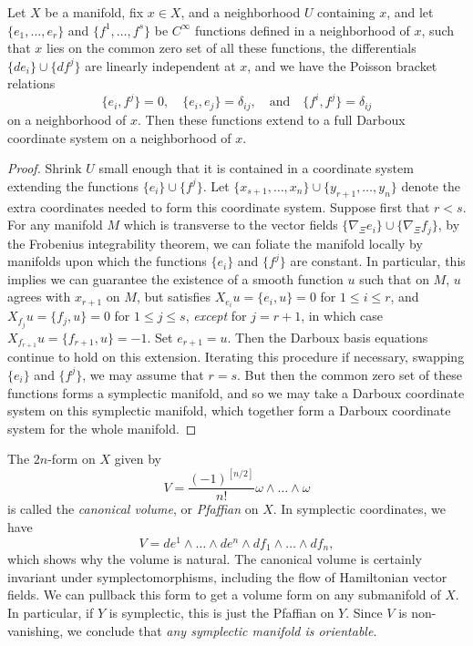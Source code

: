 \begin{theorem}
    Let $X$ be a manifold, fix $x \in X$, and a neighborhood $U$ containing $x$, and let $\{ e_1,\dots,e_r \}$ and $\{ f^1,\dots,f^s \}$ be $C^\infty$ functions defined in a neighborhood of $x$, such that $x$ lies on the common zero set of all these functions, the differentials $\{ de_i \} \cup \{ df^j \}$ are linearly independent at $x$, and we have the Poisson bracket relations
    \[ \{ e_i, f^j \} = 0, \quad \{ e_i, e_j \} = \delta_{ij}, \quad\text{and}\quad \{ f^i, f^j \} = \delta_{ij} \]
    on a neighborhood of $x$. Then these functions extend to a full Darboux coordinate system on a neighborhood of $x$.
\end{theorem}
\begin{proof}
    Shrink $U$ small enough that it is contained in a coordinate system extending the functions $\{ e_i \} \cup \{ f^j \}$. Let $\{ x_{s+1}, \dots, x_n \} \cup \{ y_{r+1}, \dots, y_n \}$ denote the extra coordinates needed to form this coordinate system. Suppose first that $r < s$. For any manifold $M$ which is transverse to the vector fields $\{ \nabla_\Xi e_i \} \cup \{ \nabla_\Xi f_j \}$, by the Frobenius integrability theorem, we can foliate the manifold locally by manifolds upon which the functions $\{ e_i \}$ and $\{ f^j \}$ are constant. In particular, this implies we can guarantee the existence of a smooth function $u$ such that on $M$, $u$ agrees with $x_{r+1}$ on $M$, but satisfies $X_{e_i} u = \{ e_i, u \} = 0$ for $1 \leq i \leq r$, and $X_{f_j} u = \{ f_j, u \} = 0$ for $1 \leq j \leq s$, \emph{except} for $j = r+1$, in which case $X_{f_{r+1}} u = \{ f_{r+1}, u \} = -1$. Set $e_{r+1} = u$. Then the Darboux basis equations continue to hold on this extension. Iterating this procedure if necessary, swapping $\{ e_i \}$ and $\{ f^j \}$, we may assume that $r = s$. But then the common zero set of these functions forms a symplectic manifold, and so we may take a Darboux coordinate system on this symplectic manifold, which together form a Darboux coordinate system for the whole manifold.
\end{proof}

The $2n$-form on $X$ given by
%
\[ V = \frac{(-1)^{[n/2]}}{n!} \omega \wedge \dots \wedge \omega \]
%
is called the \emph{canonical volume}, or \emph{Pfaffian} on $X$. In symplectic coordinates, we have
%
\[ V = de^1 \wedge \dots \wedge de^n \wedge df_1 \wedge \dots \wedge df_n, \]
%
which shows why the volume is natural. The canonical volume is certainly invariant under symplectomorphisms, including the flow of Hamiltonian vector fields. We can pullback this form to get a volume form on any submanifold of $X$. In particular, if $Y$ is symplectic, this is just the Pfaffian on $Y$. Since $V$ is non-vanishing, we conclude that \emph{any symplectic manifold is orientable}.

